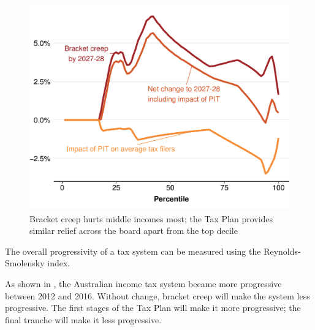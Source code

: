 \documentclass[submission]{grattan}
\newenvironment{knitrout}{}{} %
\begin{document}
\begin{figure}
\caption{Bracket creep hurts middle incomes most; the Tax Plan provides similar relief across the board apart from the top decile }\label{fig:3}
\begin{knitrout}
\color{fgcolor}
\includegraphics[width=4.47222in,height=3.51158068592058in]{atlas/fig3-1} 

\end{knitrout}
\end{figure}

The overall progressivity of a tax system can be measured using the Reynolds-Smolensky index.

As shown in , the Australian income tax system became more progressive between 2012 and 2016. Without change, bracket creep will make the system less progressive. The first stages of the Tax Plan will make it more progressive; the final tranche will make it less progressive.
\end{document}
